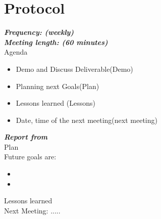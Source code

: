 \documentclass{scrartcl}
\begin{document}
	
	
	




 









 

 























                      
        
    


   

   
    
   
  

\section{Protocol}
\textbf{\textit{Frequency: (weekly) \\
Meeting length: (60 minutes)}}\\

Agenda

\begin{itemize}
  	\item Demo and Discuss Deliverable(Demo)
  	\item Planning next Goals(Plan)
  	\item Lessons learned (Lessons)
  	\item Date, time of the next meeting(next meeting)
 \end{itemize} 	


\textbf{\textit{Report from   }}\\
Plan\\
Future goals are: 
\begin{itemize}


	\item 
	\item 
\end{itemize}	
Lessons learned\\

Next Meeting: .....\\



\end{document}
